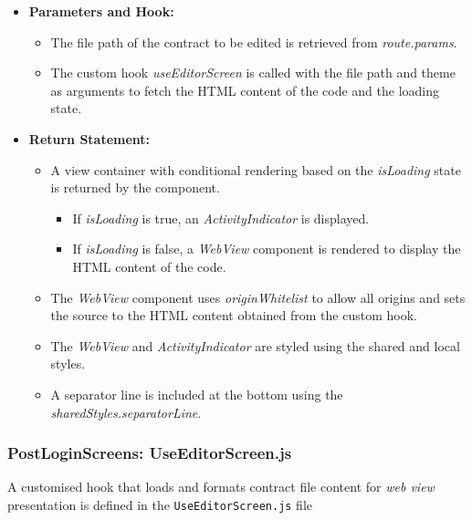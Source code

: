 \begin{itemize}
    \item \textbf{Parameters and Hook:}
    \begin{itemize}
        \item The file path of the contract to be edited is retrieved from \textit{route.params}.
        \item The custom hook \textit{useEditorScreen} is called with the file path and theme as arguments to fetch the HTML content of the code and the loading state.
    \end{itemize}

    \item \textbf{Return Statement:}
    \begin{itemize}
        \item A view container with conditional rendering based on the \textit{isLoading} state is returned by the component.
        \begin{itemize}
            \item If \textit{isLoading} is true, an \textit{ActivityIndicator} is displayed.
            \item If \textit{isLoading} is false, a \textit{WebView} component is rendered to display the HTML content of the code.
        \end{itemize}
        \item The \textit{WebView} component uses \textit{originWhitelist} to allow all origins and sets the source to the HTML content obtained from the custom hook.
        \item The \textit{WebView} and \textit{ActivityIndicator} are styled using the shared and local styles.
        
        \item A separator line is included at the bottom using the \textit{sharedStyles.separatorLine}.
    \end{itemize}
\end{itemize}

\subsubsection{PostLoginScreens: UseEditorScreen.js}

A customised hook that loads and formats contract file content for \textit{web view} presentation is defined in the \texttt{UseEditorScreen.js} file

